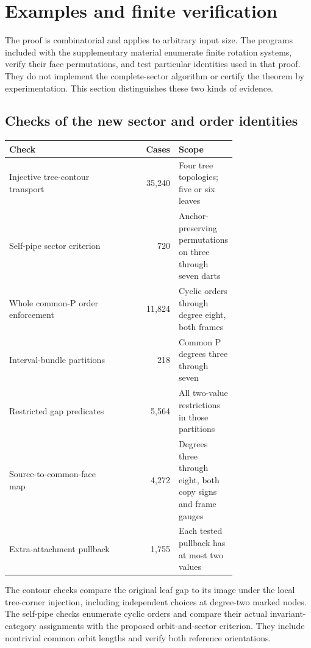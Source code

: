\section{Examples and finite verification}
\label{sec:verification}

The proof is combinatorial and applies to arbitrary input size. The programs
included with the supplementary material enumerate finite rotation systems, verify their
face permutations, and test particular identities used in that proof.
They do not implement the complete-sector algorithm or certify the theorem
by experimentation. This section distinguishes these two kinds of evidence.

\subsection{Checks of the new sector and order identities}

\begin{center}
\begin{tabular}{>{\raggedright\arraybackslash}p{0.49\linewidth}r >{\raggedright\arraybackslash}p{0.25\linewidth}}
\toprule
Check & Cases & Scope \\
\midrule
Injective tree-contour transport & 35,240 & Four tree topologies; five or six leaves \\
Self-pipe sector criterion & 720 & Anchor-preserving permutations on three through seven darts \\
Whole common-P order enforcement & 11,824 & Cyclic orders through degree eight, both frames \\
Interval-bundle partitions & 218 & Common P degrees three through seven \\
Restricted gap predicates & 5,564 & All two-value restrictions in those partitions \\
Source-to-common-face map & 4,272 & Degrees three through eight, both copy signs and frame gauges \\
Extra-attachment pullback & 1,755 & Each tested pullback has at most two values \\
\bottomrule
\end{tabular}
\end{center}

The contour checks compare the original leaf gap to its image under the
local tree-corner injection, including independent choices at degree-two
marked nodes. The self-pipe checks enumerate cyclic orders and compare their
actual invariant-category assignments with the proposed orbit-and-sector
criterion. They include nontrivial common orbit lengths and verify both
reference orientations.

